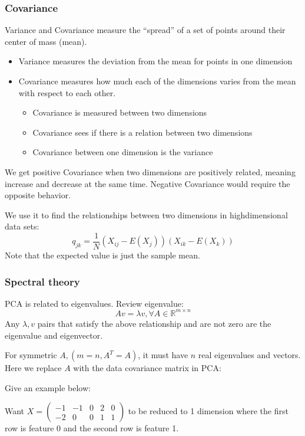 \documentclass[letterpaper,12pt]{article}
\begin{document}
\subsubsection{Covariance}
Variance and Covariance measure the ``spread'' of a set of points around their center of mass (mean).
\begin{itemize}
    \item Variance measures the deviation from the mean for points in one dimension
    \item Covariance measures how much each of the dimensions varies from the mean with respect to each other. 
    \begin{itemize}
        \item Covariance is measured between two dimensions
        \item Covariance sees if there is a relation between two dimensions
        \item Covariance between one dimension is the variance
    \end{itemize}
\end{itemize}
We get positive Covariance when two dimensions are positively related, meaning increase and decrease at the same time. Negative Covariance would require the opposite behavior. 

We use it to find the relationships between two dimensions in high\-dimensional data sets:
\[q_{jk}=\frac{1}{N}(X_{ij}-E(X_j))(X_{ik}-E(X_k))\]
Note that the expected value is just the sample mean.

\subsubsection{Spectral theory}
PCA is related to eigenvalues. Review eigenvalue:
\[Av=\lambda v ,\forall A\in \mathbb{R}^{m\times n}\]
Any $\lambda, v$ pairs that satisfy the above relationship and are not zero are the eigenvalue and eigenvector. 

For symmetric $A, (m=n,A^T=A)$, it must have $n$ real eigenvalues and vectors. Here we replace $A$ with the data covariance matrix in PCA:

Give an example below:

    Want $X =  \begin{pmatrix}
        -1 & -1 & 0 & 2 & 0\\
        -2 & 0 & 0 & 1 & 1
    \end{pmatrix}$ to be reduced to 1 dimension where the first row is feature 0 and the second row is feature 1.
\end{document}
